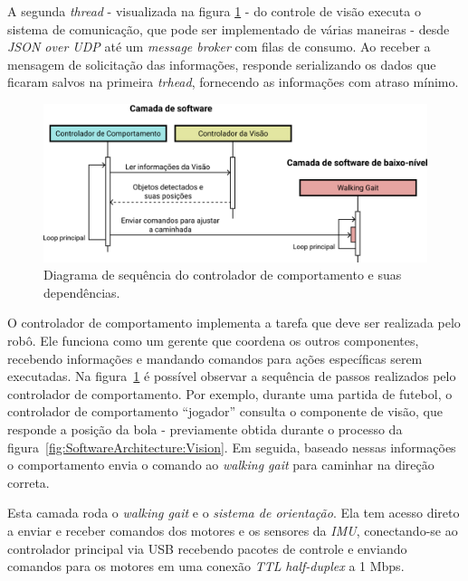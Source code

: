 A segunda \textit{thread} - visualizada na figura \ref{fig:SoftwareArchitecture:Software} - do controle de visão executa o sistema de comunicação, que pode ser implementado de várias maneiras - desde \textit{JSON over UDP} até um \textit{message broker} com filas de consumo. Ao receber a mensagem de solicitação das informações, responde serializando os dados que ficaram salvos na primeira \textit{trhead}, fornecendo as informações com atraso mínimo.

\begin{figure}[h!]
	\centering
	\includegraphics[scale=1]{imagens/svg/softwarearchitecture-software}
	\caption{Diagrama de sequência do controlador de comportamento e suas dependências.}
	\label{fig:SoftwareArchitecture:Software}
\end{figure}

O controlador de comportamento implementa a tarefa que deve ser realizada pelo robô. Ele funciona como um gerente que coordena os outros componentes, recebendo informações e mandando comandos para ações específicas serem executadas. Na figura~\ref{fig:SoftwareArchitecture:Software} é possível observar a sequência de passos realizados pelo controlador de comportamento. Por exemplo, durante uma partida de futebol, o controlador de comportamento ``jogador'' consulta o componente de visão, que responde a posição da bola - previamente obtida durante o processo da figura~\ref{fig:SoftwareArchitecture:Vision}. Em seguida, baseado nessas informações o comportamento envia o comando ao \textit{walking gait} para caminhar na direção correta.

\begin{draft}
Esta camada roda o \textit{walking gait} e o \textit{sistema de orientação}. Ela tem acesso direto a enviar e receber comandos dos motores e os sensores da \textit{IMU}, conectando-se ao controlador principal via USB recebendo pacotes de controle e enviando comandos para os motores em uma conexão \textit{TTL} \textit{half-duplex} a 1 Mbps.
\end{draft}

